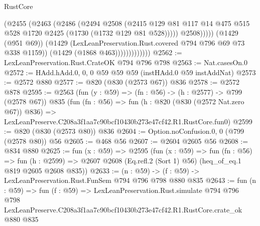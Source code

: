 \begin{lexlean}{RustCore}
\begin{coremodule}
                                (@2455
                                  (@2463
                                    (@2486
                                      (@2494
                                        @2508
                                        (@2415
                                          @129
                                          @81
                                          @117
                                          @14
                                          @475
                                          @515
                                          @528
                                          @1720
                                          @2425
                                          (@1730 (@1732 @129 @81 @528)))))
                                    @2508)))))
                          (@1429 (@951 @69))
                          (@1429 (LexLeanPreservation.Rust.covered @794 @796 @69 @73 @338 @1159))
                          (@1429 (@1868 @463)))))))))))))
@2562 := LexLeanPreservation.Rust.CrateOK @794 @796 @798
@2563 := Nat.casesOn.{0}
@2572 := HAdd.hAdd.{0, 0, 0} @59 @59 @59 (instHAdd.{0} @59 instAddNat)
@2573 := @2572 @880
@2577 := @820 (@830 (@2573 @67)) @836
@2578 := @2572 @878
@2595 := @2563
    (fun (y : @59) => (fn : @56) -> (h : @2577) -> @799 (@2578 @67))
    @835
    (fun (fn : @56) =>
    fun (h : @820 (@830 (@2572 Nat.zero @67)) @836) =>
    LexLeanPreserve.C208a3f1aa7c90bcf10430b273e47cf42.R1.RustCore.fun0)
@2599 := @820 (@830 (@2573 @80)) @836
@2604 := Option.noConfusion.{0, 0} (@799 (@2578 @80)) @56
@2605 := @468 @56
@2607 := @2604 @2605 @56
@2608 := @834 @880
@2625 := fun (x : @59) =>
  @2595
    (fun (x : @59) =>
    fun (fn : @56) =>
    fun (h : @2599) => @2607 @2608 (Eq.refl.{2} (Sort 1) @56) (heq_of_eq.{1} @819 @2605 @2608 @835))
@2633 := (n : @59) -> (f : @59) -> LexLeanPreservation.Rust.FunSem @794 @796 @798 @880 @835
@2643 := fun (n : @59) =>
  fun (f : @59) =>
  LexLeanPreservation.Rust.simulate
    @794
    @796
    @798
    LexLeanPreserve.C208a3f1aa7c90bcf10430b273e47cf42.R1.RustCore.crate_ok
    @880
    @835
\end{coremodule}
\end{lexlean}

